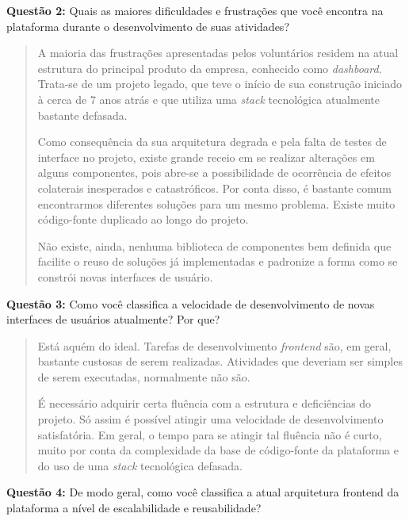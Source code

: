 \textbf{Questão 2:} Quais as maiores dificuldades e frustrações que você encontra na plataforma durante o desenvolvimento de suas atividades?

\begin{quote}
    A maioria das frustrações apresentadas pelos voluntários residem na atual estrutura do principal produto da empresa, conhecido como \textit{dashboard}. Trata-se de um projeto legado, que teve o início de sua construção iniciado à cerca de 7 anos atrás e que utiliza uma \textit{stack} tecnológica atualmente bastante defasada.
    
    Como consequência da sua arquitetura degrada e pela falta de testes de interface no projeto, existe grande receio em se realizar alterações em alguns componentes, pois abre-se a possibilidade de ocorrência de efeitos colaterais inesperados e catastróficos. Por conta disso, é bastante comum encontrarmos diferentes soluções para um mesmo problema. Existe muito código-fonte duplicado ao longo do projeto.
    
    Não existe, ainda, nenhuma biblioteca de componentes bem definida que facilite o reuso de soluções já implementadas e padronize a forma como se constrói novas interfaces de usuário.
\end{quote}

\textbf{Questão 3:} Como você classifica a velocidade de desenvolvimento de novas interfaces de usuários atualmente? Por que?

\begin{quote}
    Está aquém do ideal. Tarefas de desenvolvimento \textit{frontend} são, em geral, bastante custosas de serem realizadas. Atividades que deveriam ser simples de serem executadas, normalmente não são.
    
    É necessário adquirir certa fluência com a estrutura e deficiências do projeto. Só assim é possível atingir uma velocidade de desenvolvimento satisfatória. Em geral, o tempo para se atingir tal fluência não é curto, muito por conta da complexidade da base de código-fonte da plataforma e do uso de uma \textit{stack} tecnológica defasada.
\end{quote}

\textbf{Questão 4:} De modo geral, como você classifica a atual arquitetura frontend da plataforma a nível de escalabilidade e reusabilidade?

